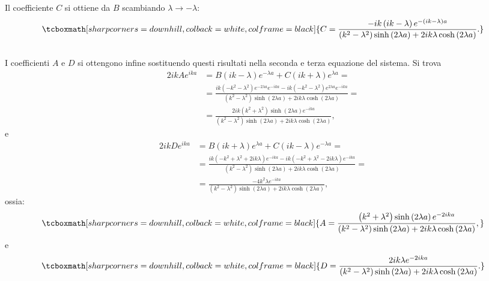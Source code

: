 Il coefficiente $C$ si ottiene da $B$ scambiando $\lambda \rightarrow -\lambda$:
	\begin{equation}
		\tcboxmath[sharp corners=downhill, colback=white, colframe=black]{
			C=\frac{-ik\left(ik-\lambda \right)e^{-\left(ik-\lambda\right) a }}{\left(k^2-\lambda^2\right)\sinh \left(2\lambda a\right)+2ik\lambda \cosh\left(2\lambda a\right)}.
			}
	\end{equation}\\
	
I coefficienti $A$ e $D$ si ottengono infine sostituendo questi risultati nella seconda e terza equazione del sistema. Si trova
	\begin{align}
 2ikAe^{ika} &= B \left(ik-\lambda\right)e^{-\lambda a} +C \left(ik+\lambda\right)e^{\lambda a}=\nonumber \\[0.3cm]
	& = \displaystyle{\frac{ik\left(-k^2-\lambda ^2 \right)e^{-2\lambda a }e^{-ika }-ik\left(-k^2-\lambda ^2 \right)e^{2\lambda a }e^{-ika }}{\left(k^2-\lambda^2\right)\sinh \left(2\lambda a\right)+2ik\lambda \cosh\left(2\lambda a\right)}=} \nonumber \\[0.3cm]
	&\displaystyle{ =\frac{2ik\left(k^2+\lambda ^2 \right)\sinh\left(2\lambda a\right)e^{-ika}}{\left(k^2-\lambda^2\right)\sinh \left(2\lambda a\right)+2ik\lambda \cosh\left(2\lambda a\right)}},
	\end{align}
e
	\begin{align}
		2ikD e^{ika} &= B\left(ik+\lambda\right)e^{\lambda a} + C\left(ik-\lambda\right)e^{-\lambda a} = \nonumber \\[0.3cm]
		& = \displaystyle{\frac{ik\left(-k^2 + \lambda ^2 +2ik\lambda\right)e^{-ika}-ik\left(-k^2 + \lambda ^2 -2ik\lambda\right)e^{-ika}}{\left(k^2-\lambda^2\right)\sinh \left(2\lambda a\right)+2ik\lambda \cosh\left(2\lambda a\right)}=} \nonumber \\[0.3cm]
	&\displaystyle{ =\frac{-4k^2\lambda e^{-ika}}{\left(k^2-\lambda^2\right)\sinh \left(2\lambda a\right)+2ik\lambda \cosh\left(2\lambda a\right)}},
	\end{align}
ossia:
	\begin{equation}
		\tcboxmath[sharp corners=downhill, colback=white, colframe=black]{
			A=\frac{\left(k^2+\lambda ^2\right)\sinh\left(2\lambda a \right)e^{-2ika}}{\left(k^2-\lambda^2\right)\sinh \left(2\lambda a\right)+2ik\lambda \cosh\left(2\lambda a\right)},
			}
	\end{equation}
e
	\begin{equation}
		\tcboxmath[sharp corners=downhill, colback=white, colframe=black]{
			D=\frac{2ik\lambda e^{-2ika}}{\left(k^2-\lambda^2\right)\sinh \left(2\lambda a\right)+2ik\lambda \cosh\left(2\lambda a\right)}.
			}
	\end{equation}\\
	

